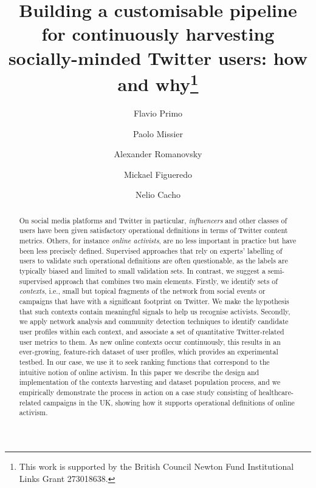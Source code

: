 \documentclass[runningheads]{llncs}
\begin{document}
%
\title{Building a customisable pipeline for continuously harvesting socially-minded Twitter users: how and why\thanks{This work is supported by the British Council Newton Fund Institutional Links Grant 273018638.}}
%
%
\author{Flavio Primo \and
Paolo Missier \and
Alexander Romanovsky \and
Mickael Figueredo \and
Nelio Cacho}

%
%
%
\maketitle       %
%
\begin{abstract}
On social media platforms and Twitter in particular, \textit{influencers} and other classes of users have been given satisfactory operational definitions in terms of Twitter content metrics.
Others, for instance \textit{online activists}, are no less important in practice but have been less precisely defined.
Supervised approaches that rely on experts' labelling of users to validate such operational definitions are often questionable, as the labels are typically biased and limited to small validation sets.
%
In contrast, we suggest a semi-supervised approach that combines two main elements. 
Firstly, we identify sets of \textit{contexts}, i.e., small but topical fragments of the network from social events or campaigns that have with a significant footprint on Twitter.
We make the hypothesis that such contexts contain meaningful signals to help us recognise activists. 
Secondly, we apply network analysis and community detection techniques to identify candidate user profiles within each context, and associate a set of quantitative Twitter-related user metrics to them.
As new online contexts occur continuously, this results in an ever-growing, feature-rich dataset of user profiles, which provides an experimental testbed. In our case, we use it to seek ranking functions that correspond to the intuitive notion of online activism.
In this paper we describe the design and implementation of the contexts harvesting and dataset population process, and we empirically demonstrate the process in action on a case study consisting of healthcare-related campaigns in the UK, showing how it supports operational definitions of online activism.

\end{abstract}
%
\end{document}
